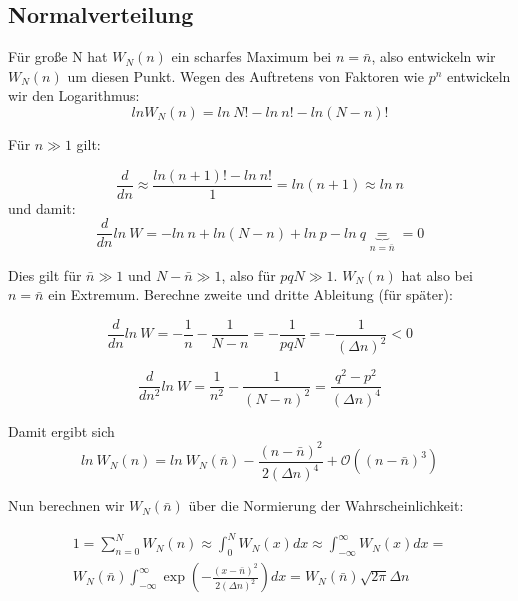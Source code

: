\documentclass[ngerman]{scrartcl}
\begin{document}
	
	\subsection{Normalverteilung}
	
	Für große N hat $W_N(n)$ ein scharfes Maximum bei $n=\bar{n}$, also entwickeln wir $W_N(n)$ um diesen Punkt. Wegen des Auftretens von Faktoren wie $p^n$ entwickeln wir den Logarithmus:
	\begin{equation}
		ln W_N(n)=ln~N! - ln~n ! - ln(N-n)!
	\end{equation} %
	
	Für $n\gg 1$ gilt:
	
	\begin{equation}
		\frac{d}{dn}\approx\frac{ln(n+1)! - ln~n!}{1}=ln(n+1)\approx ln~n
	\end{equation}
	und damit:
	\begin{equation}
		\frac{d}{dn}ln~W=-ln~n + ln(N-n) + ln~p - ln~q \underbrace{=}_{n=\bar{n}} = 0
	\end{equation}
	
	Dies gilt für $\bar{n}\gg 1$ und $N-\bar{n}\gg 1$, also für $pqN\gg 1$. $W_N(n)$ hat also bei $n=\bar{n}$ ein Extremum. Berechne zweite und dritte Ableitung (für später):
	
	\begin{equation}
		\frac{d}{dn}ln~W = -\frac{1}{n} - \frac{1}{N-n} = - \frac{1}{pqN}=-\frac{1}{(\Delta n)^2} < 0
	\end{equation}
	
	\begin{equation}
		\frac{d}{dn^2}ln~W = \frac{1}{n^2} - \frac{1}{(N-n)^2} = \frac{q^2-p^2}{(\Delta n)^4}
	\end{equation}
	
	Damit ergibt sich
	\begin{equation}
		ln~W_N(n)=ln~W_N(\bar{n}) - \frac{(n-\bar{n})^2}{2(\Delta n)^4} + \mathcal{O}\left((n-\bar{n})^3\right)
	\end{equation}
	
	Nun berechnen wir $W_N(\bar{n})$ über die Normierung der Wahrscheinlichkeit:
	
	\begin{gather}
		1 = \sum_{n=0}^N W_N(n) \approx \int_0^N W_N(x)dx \approx \int_{-\infty}^{\infty} W_N(x)dx =\\ 
		W_N(\bar{n}) \int_{-\infty}^{\infty} \exp\left(-\frac{(x-\bar{n})^2}{2(\Delta n)^2}\right)dx= W_N(\bar{n}) \sqrt{2\pi} \Delta n
	\end{gather}
	
\end{document}
